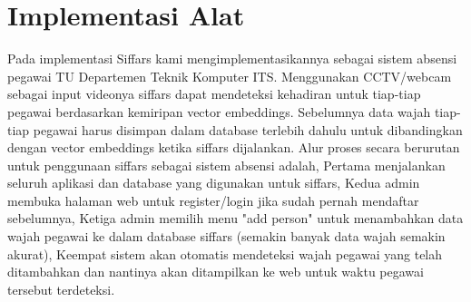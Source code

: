 \section{Implementasi Alat}

Pada implementasi Siffars kami mengimplementasikannya sebagai sistem absensi pegawai TU Departemen
Teknik Komputer ITS. Menggunakan CCTV/webcam sebagai input videonya siffars dapat mendeteksi kehadiran untuk
tiap-tiap pegawai berdasarkan kemiripan vector embeddings. Sebelumnya data wajah tiap-tiap pegawai harus
disimpan dalam database terlebih dahulu untuk dibandingkan dengan vector embeddings ketika siffars dijalankan.
Alur proses secara berurutan untuk penggunaan siffars sebagai sistem absensi adalah, Pertama menjalankan seluruh
aplikasi dan database yang digunakan untuk siffars, Kedua admin membuka halaman web untuk register/login jika sudah
pernah mendaftar sebelumnya, Ketiga admin memilih menu "add person" untuk menambahkan data wajah pegawai ke dalam database siffars
(semakin banyak data wajah semakin akurat), Keempat sistem akan otomatis mendeteksi wajah pegawai yang telah ditambahkan
dan nantinya akan ditampilkan ke web untuk waktu pegawai tersebut terdeteksi.





% 
